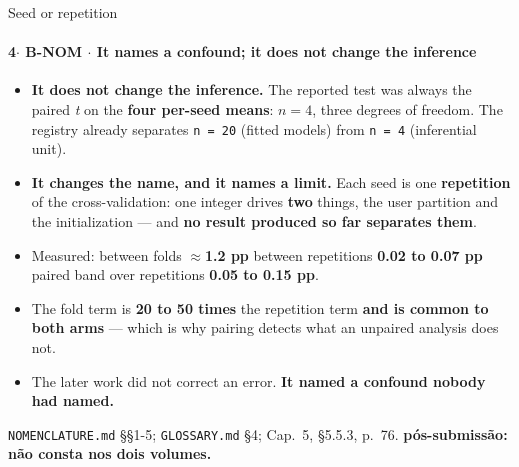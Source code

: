 \documentclass{beamer}
\begin{document}
\begin{frame}[noframenumbering]{Seed or repetition}
    \framesubtitle{\normalsize 4$\cdot$ \textbf{B-NOM} $\cdot$ It names a confound; it does not change the inference}
    \hypertarget{bnom}{}
    \small
    \begin{itemize}\setlength{\itemsep}{0pt}\setlength{\parskip}{0pt}
        \item \textbf{It does not change the inference.} The reported test was always the paired \textit{t} on the \textbf{four per-seed means}: $n = 4$, three degrees of freedom. The registry already separates \texttt{n = 20} (fitted models) from \texttt{n = 4} (inferential unit).
        \item \textbf{It changes the name, and it names a limit.} Each seed is one \textbf{repetition} of the cross-validation: one integer drives \textbf{two} things, the user partition and the initialization --- and \textbf{no result produced so far separates them}.
        \item Measured: between folds $\approx$\textbf{1.2 pp} \textbullet{} between repetitions \textbf{0.02 to 0.07 pp} \textbullet{} paired band over repetitions \textbf{0.05 to 0.15 pp}.
        \item The fold term is \textbf{20 to 50 times} the repetition term \textbf{and is common to both arms} --- which is why pairing detects what an unpaired analysis does not.
        \item The later work did not correct an error. \textbf{It named a confound nobody had named.}
    \end{itemize}
    \vfill
    {\scriptsize
    \begin{minipage}[b]{0.775\linewidth}\raggedright\textcolor{black!70}{\texttt{NOMENCLATURE.md} §§1-5; \texttt{GLOSSARY.md} §4; Cap.~5, §5.5.3, p.~76. \textbf{pós-submissão: não consta nos dois volumes.}}\end{minipage}\hfill
    \begin{minipage}[b]{0.20\linewidth}\raggedleft \hyperlink{b0}{}\end{minipage}}
\end{frame}
\end{document}
